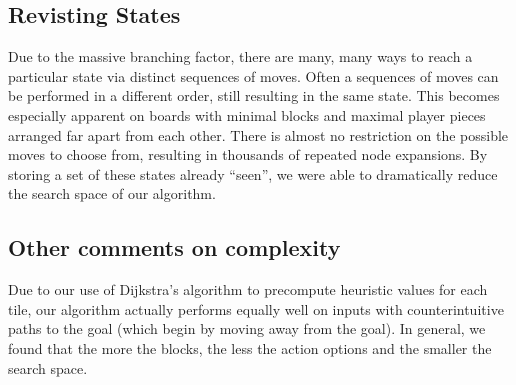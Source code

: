 \documentclass{article}[11pt]
\theoremstyle{plain}
\theoremstyle{definition}
\begin{document}
\subsection{Revisting States}

Due to the massive branching factor, there are many, many ways to reach a particular state via distinct sequences of moves. Often a sequences of moves can be performed in a different order,  still resulting in the same state. This becomes especially apparent on boards with minimal blocks and maximal player pieces arranged far apart from each other. There is almost no restriction on the possible moves to choose from, resulting in thousands of repeated node expansions. By storing a set of these states already ``seen'', we were able to dramatically reduce the search space of our algorithm.

\subsection{Other comments on complexity}

Due to our use of Dijkstra's algorithm to precompute heuristic values for each tile, our algorithm actually performs equally well on inputs with counterintuitive paths to the goal (which begin by moving away from the goal). In general, we found that the more the blocks, the less the action options and the smaller the search space.
\end{document}
